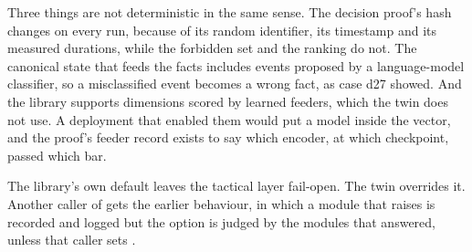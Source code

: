 Three things are not deterministic in the same sense. The decision proof's hash changes on every
run, because of its random identifier, its timestamp and its measured durations, while the
forbidden set and the ranking do not. The canonical state that feeds the facts includes events
proposed by a language-model classifier, so a misclassified event becomes a wrong fact, as case
d27 showed. And the library supports dimensions scored by learned feeders, which the twin does
not use. A deployment that enabled them would put a model inside the vector, and the proof's
feeder record exists to say which encoder, at which checkpoint, passed which bar.

The library's own default leaves the tactical layer fail-open. The twin overrides it. Another
caller of  gets the earlier behaviour, in which a module that raises is
recorded and logged but the option is judged by the modules that answered, unless that caller
sets .
